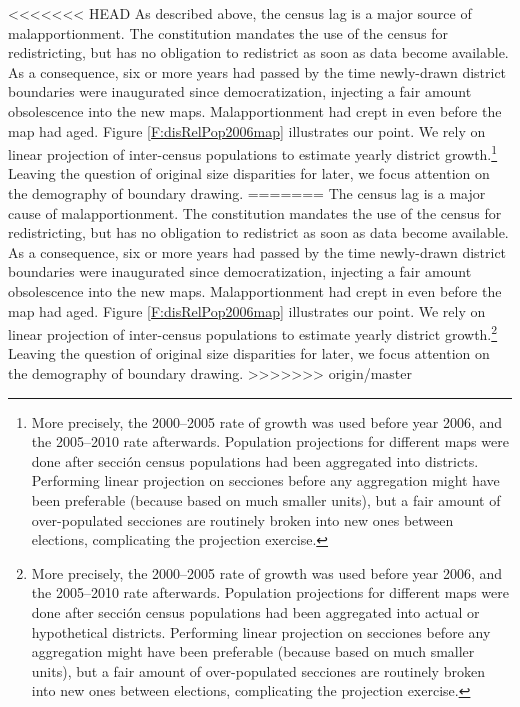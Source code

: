 \documentclass[letter,12pt]{article}
\begin{document}
<<<<<<< HEAD
As described above, the census lag is a major source of malapportionment. The constitution mandates the use of the census for redistricting, but has no obligation to redistrict as soon as data become available. As a consequence, six or more years had passed by the time newly-drawn district boundaries were inaugurated since democratization, injecting a fair amount obsolescence into the new maps. Malapportionment had crept in even before the map had aged. Figure \ref{F:disRelPop2006map} illustrates our point. We rely on linear projection of inter-census populations to estimate yearly district growth.\footnote{More precisely, the 2000--2005 rate of growth was used before year 2006, and the 2005--2010 rate afterwards. Population projections for different maps were done after secci\'on census populations had been aggregated into districts. Performing linear projection on secciones before any aggregation might have been preferable (because based on much smaller units), but a fair amount of over-populated secciones are routinely broken into new ones between elections, complicating the projection exercise.} Leaving the question of original size disparities for later, we focus attention on the demography of boundary drawing.  
=======
The census lag is a major cause of malapportionment. The constitution mandates the use of the census for redistricting, but has no obligation to redistrict as soon as data become available. As a consequence, six or more years had passed by the time newly-drawn district boundaries were inaugurated since democratization, injecting a fair amount obsolescence into the new maps. Malapportionment had crept in even before the map had aged. Figure \ref{F:disRelPop2006map} illustrates our point. We rely on linear projection of inter-census populations to estimate yearly district growth.\footnote{More precisely, the 2000--2005 rate of growth was used before year 2006, and the 2005--2010 rate afterwards. Population projections for different maps were done after secci\'on census populations had been aggregated into actual or hypothetical districts. Performing linear projection on secciones before any aggregation might have been preferable (because based on much smaller units), but a fair amount of over-populated secciones are routinely broken into new ones between elections, complicating the projection exercise.} Leaving the question of original size disparities for later, we focus attention on the demography of boundary drawing.  
>>>>>>> origin/master
\end{document}
